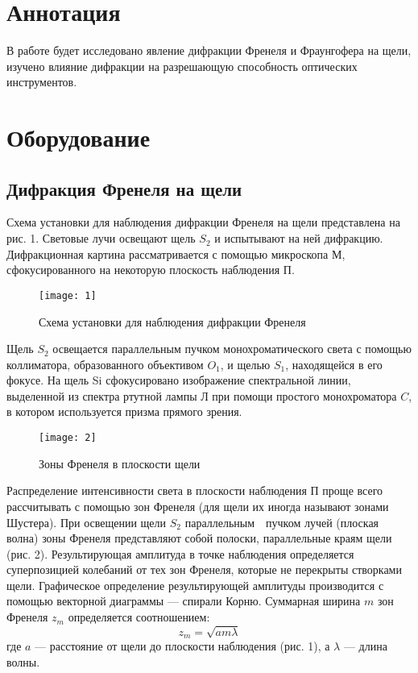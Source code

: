 \documentclass[a4paper, 12pt]{article}
\begin{document}

\section{Аннотация}
В работе будет исследовано явление дифракции Френеля и Фраунгофера на
щели, изучено
влияние дифракции на разрешающую способность оптических
инструментов.


\section{Оборудование}
\subsection*{Дифракция Френеля на щели}
Схема установки для наблюдения дифракции Френеля на щели представлена
на рис. 1. Световые лучи освещают щель $S_2$ и испытывают на ней
дифракцию. Дифракционная картина рассматривается с помощью микроскопа
М, сфокусированного на некоторую плоскость наблюдения П.

\begin{figure}[H]
    \texttt{[image: 1]} 
    \captionsetup{justification=centering}
    \caption{Схема установки для наблюдения дифракции Френеля}
\end{figure}

Щель $S_2$ освещается параллельным пучком монохроматического света с
помощью коллиматора, образованного объективом $O_1$, и щелью $S_1$,
находящейся в его фокусе. На щель Si сфокусировано изображение
спектральной линии, выделенной из спектра ртутной лампы Л при помощи
простого монохроматора $C$, в котором используется призма прямого
зрения.

\begin{wrapfigure}{r}{0.3\linewidth}
    \vspace{-16pt}
    \texttt{[image: 2]}
    \captionsetup{justification=centering}
    \caption{Зоны Френеля в плоскости щели}
\end{wrapfigure}

Распределение интенсивности света в плоскости наблюдения П проще всего
рассчитывать с помощью зон Френеля (для щели их иногда называют зонами
Шустера). При освещении щели $S_2$ параллельным пучком лучей (плоская
волна) зоны Френеля представляют собой полоски,
параллельные краям щели (рис. 2). Результирующая амплитуда в точке
наблюдения определяется суперпозицией колебаний от тех зон Френеля,
которые не перекрыты створками щели. Графическое определение
результирующей амплитуды производится с помощью векторной диаграммы —
спирали Корню. Суммарная ширина $m$ зон Френеля $z_m$ определяется
соотношением:
\begin{equation}
    z_m = \sqrt{a m \lambda}
\end{equation}
где $a$ --- расстояние от щели до плоскости наблюдения (рис. 1), а
$\lambda$ --- длина волны.
\end{document}
